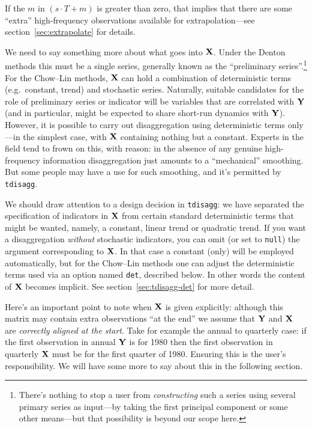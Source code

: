 If the $m$ in $(s \cdot T + m)$ is greater than zero, that implies
that there are some ``extra'' high-frequency observations available
for extrapolation---see section~\ref{sec:extrapolate} for details.

We need to say something more about what goes into $\mathbf{X}$. Under the
Denton methods this must be a single series, generally known as the
``preliminary series''.\footnote{There's nothing to stop a user from
  \textit{constructing} such a series using several primary series as
  input---by taking the first principal component or some other
  means---but that possibility is beyond our scope here.} For the
Chow--Lin methods, $\mathbf{X}$ can hold a combination of deterministic terms
(e.g.\ constant, trend) and stochastic series. Naturally, suitable
candidates for the role of preliminary series or indicator will be
variables that are correlated with $\mathbf{Y}$ (and in particular, might be
expected to share short-run dynamics with $\mathbf{Y}$). However, it is
possible to carry out disaggregation using deterministic terms
only---in the simplest case, with $\mathbf{X}$ containing nothing but a
constant. Experts in the field tend to frown on this, with reason: in
the absence of any genuine high-frequency information disaggregation
just amounts to a ``mechanical'' smoothing. But some people may have a
use for such smoothing, and it's permitted by \texttt{tdisagg}.

We should draw attention to a design decision in \texttt{tdisagg}: we
have separated the specification of indicators in $\mathbf{X}$ from certain
standard deterministic terms that might be wanted, namely, a constant,
linear trend or quadratic trend. If you want a disaggregation
\textit{without} stochastic indicators, you can omit (or set to
\texttt{null}) the argument corresponding to $\mathbf{X}$. In that case a
constant (only) will be employed automatically, but for the Chow--Lin
methods one can adjust the deterministic terms used via an option
named \texttt{det}, described below. In other words the content of
$\mathbf{X}$ becomes implicit. See section~\ref{sec:tdisagg-det} for more
detail.

Here's an important point to note when $\mathbf{X}$ is given explicitly:
although this matrix may contain extra observations ``at the end'' we
assume that $\mathbf{Y}$ and $\mathbf{X}$ are \textit{correctly aligned at the
  start}. Take for example the annual to quarterly case: if the first
observation in annual $\mathbf{Y}$ is for 1980 then the first observation in
quarterly $\mathbf{X}$ must be for the first quarter of 1980. Ensuring this
is the user's responsibility. We will have some more to say about this
in the following section.

